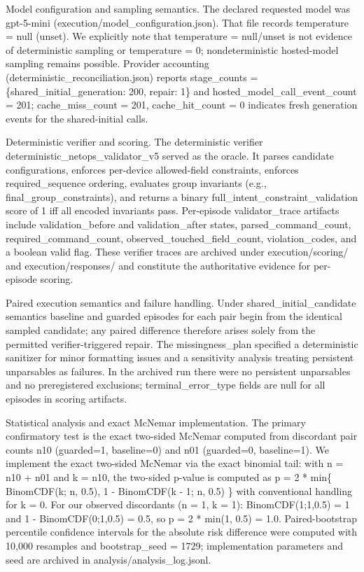 \documentclass[conference]{IEEEtran}
\begin{document}
Model configuration and sampling semantics. The declared requested model was gpt-5-mini (execution/model\_configuration.json). That file records temperature = null (unset). We explicitly note that temperature = null/unset is not evidence of deterministic sampling or temperature = 0; nondeterministic hosted-model sampling remains possible. Provider accounting (deterministic\_reconciliation.json) reports stage\_counts = \{shared\_initial\_generation: 200, repair: 1\} and hosted\_model\_call\_event\_count = 201; cache\_miss\_count = 201, cache\_hit\_count = 0 indicates fresh generation events for the shared-initial calls.

Deterministic verifier and scoring. The deterministic verifier deterministic\_netops\_validator\_v5 served as the oracle. It parses candidate configurations, enforces per-device allowed-field constraints, enforces required\_sequence ordering, evaluates group invariants (e.g., final\_group\_constraints), and returns a binary full\_intent\_constraint\_validation score of 1 iff all encoded invariants pass. Per-episode validator\_trace artifacts include validation\_before and validation\_after states, parsed\_command\_count, required\_command\_count, observed\_touched\_field\_count, violation\_codes, and a boolean valid flag. These verifier traces are archived under execution/scoring/ and execution/responses/ and constitute the authoritative evidence for per-episode scoring.

Paired execution semantics and failure handling. Under shared\_initial\_candidate semantics baseline and guarded episodes for each pair begin from the identical sampled candidate; any paired difference therefore arises solely from the permitted verifier-triggered repair. The missingness\_plan specified a deterministic sanitizer for minor formatting issues and a sensitivity analysis treating persistent unparsables as failures. In the archived run there were no persistent unparsables and no preregistered exclusions; terminal\_error\_type fields are null for all episodes in scoring artifacts.

Statistical analysis and exact McNemar implementation. The primary confirmatory test is the exact two-sided McNemar computed from discordant pair counts n10 (guarded=1, baseline=0) and n01 (guarded=0, baseline=1). We implement the exact two-sided McNemar via the exact binomial tail: with n = n10 + n01 and k = n10, the two-sided p-value is computed as
p = 2 * min\{ BinomCDF(k; n, 0.5), 1 - BinomCDF(k - 1; n, 0.5) \}
with conventional handling for k = 0. For our observed discordants (n = 1, k = 1): BinomCDF(1;1,0.5) = 1 and 1 - BinomCDF(0;1,0.5) = 0.5, so p = 2 * min(1, 0.5) = 1.0. Paired-bootstrap percentile confidence intervals for the absolute risk difference were computed with 10,000 resamples and bootstrap\_seed = 1729; implementation parameters and seed are archived in analysis/analysis\_log.jsonl.
\end{document}
